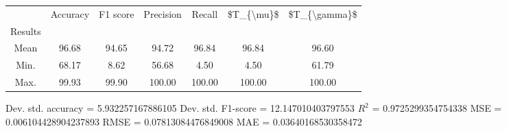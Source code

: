 \begin{tabular}{|c|c|c|c|c|c|c|}
\toprule
{} &  Accuracy &  F1 score &  Precision &  Recall &  \$T\_\{\textbackslash mu\}\$ &  \$T\_\{\textbackslash gamma\}\$ \\
Results &           &           &            &         &            &               \\
\hline
Mean    &     96.68 &     94.65 &      94.72 &   96.84 &      96.84 &         96.60 \\
Min.    &     68.17 &      8.62 &      56.68 &    4.50 &       4.50 &         61.79 \\
Max.    &     99.93 &     99.90 &     100.00 &  100.00 &     100.00 &        100.00 \\
\bottomrule
\end{tabular}

 Dev. std. accuracy = 5.932257167886105
 Dev. std. F1-score = 12.147010403797553
 $R^2$ = 0.9725299354754338
 MSE = 0.006104428904237893
 RMSE = 0.07813084476849008
 MAE = 0.03640168530358472
